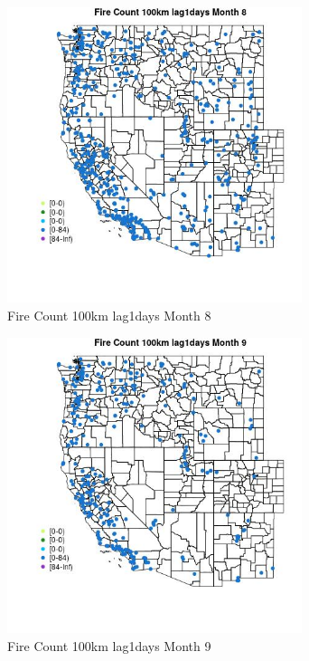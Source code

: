 \begin{figure} 
\centering  
\includegraphics[width=0.77\textwidth]{Code_Outputs/Report_ML_input_PM25_Step4_part_e_de_duplicated_aves_compiled_2019-05-18wNAs_MapObsMo8Fire_Count_100km_lag1days.jpg} 
\caption{\label{fig:Report_ML_input_PM25_Step4_part_e_de_duplicated_aves_compiled_2019-05-18wNAsMapObsMo8Fire_Count_100km_lag1days}Fire Count 100km lag1days Month 8} 
\end{figure} 
 

\begin{figure} 
\centering  
\includegraphics[width=0.77\textwidth]{Code_Outputs/Report_ML_input_PM25_Step4_part_e_de_duplicated_aves_compiled_2019-05-18wNAs_MapObsMo9Fire_Count_100km_lag1days.jpg} 
\caption{\label{fig:Report_ML_input_PM25_Step4_part_e_de_duplicated_aves_compiled_2019-05-18wNAsMapObsMo9Fire_Count_100km_lag1days}Fire Count 100km lag1days Month 9} 
\end{figure} 
 

